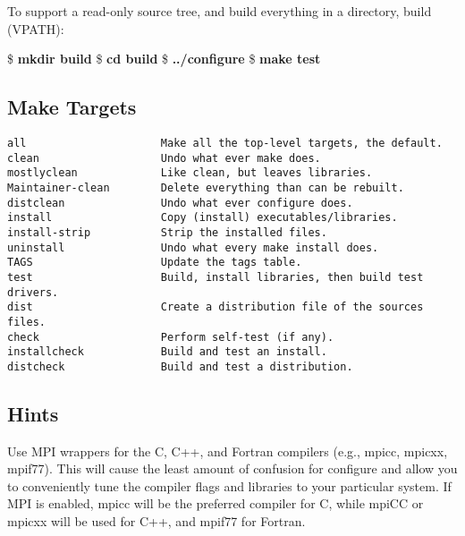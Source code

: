 To support a read-only source tree, and build everything in a 
directory, build (VPATH):
\begin{ttfamily}
\begin{mdseries}
\linebreak
\$ \textbf{mkdir build}\linebreak
\$ \textbf{cd build}\linebreak
\$ \textbf{../configure}\linebreak
\$ \textbf{make test}\linebreak
\end{mdseries}
\end{ttfamily}

\subsection{Make Targets}

\begin{ttfamily}
\begin{mdseries}
\begin{verbatim}
all                     Make all the top-level targets, the default.
clean                   Undo what ever make does.
mostlyclean             Like clean, but leaves libraries.
Maintainer-clean        Delete everything than can be rebuilt.
distclean               Undo what ever configure does.
install                 Copy (install) executables/libraries.
install-strip           Strip the installed files.
uninstall               Undo what every make install does.
TAGS                    Update the tags table.
test                    Build, install libraries, then build test drivers.
dist                    Create a distribution file of the sources files.
check                   Perform self-test (if any).
installcheck            Build and test an install.
distcheck               Build and test a distribution.
\end{verbatim}
\end{mdseries}
\end{ttfamily}

\subsection{Hints}

Use MPI wrappers for the C, C++, and Fortran compilers (e.g.,
mpicc, mpicxx, mpif77).  This will cause the least amount of 
confusion for configure and allow you to conveniently tune the 
compiler flags and libraries to your particular system. If MPI 
is enabled, mpicc will be the preferred compiler for C, while 
mpiCC or mpicxx will be used for C++, and mpif77 for Fortran.

